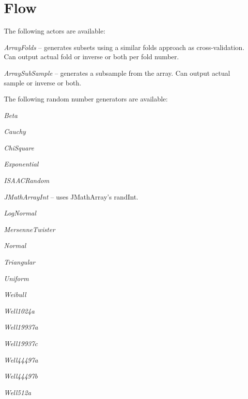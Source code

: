 \documentclass[a4paper]{book}
\begin{document}
\chapter{Flow}
The following actors are available:
\begin{tight_itemize}
	\item \textit{ArrayFolds} -- generates subsets using a similar folds 
	approach as cross-validation. Can output actual fold or inverse or both
	per fold number.
	\item \textit{ArraySubSample} -- generates a subsample from the array. 
	Can output actual sample or inverse or both.
\end{tight_itemize}
The following random number generators are available:
\begin{tight_itemize}
	\item \textit{Beta}
	\item \textit{Cauchy}
	\item \textit{ChiSquare}
	\item \textit{Exponential}
	\item \textit{ISAACRandom}
	\item \textit{JMathArrayInt} -- uses JMathArray's randInt.
	\item \textit{LogNormal}
	\item \textit{MersenneTwister}
	\item \textit{Normal}
	\item \textit{Triangular}
	\item \textit{Uniform}
	\item \textit{Weibull}
	\item \textit{Well1024a}
	\item \textit{Well19937a}
	\item \textit{Well19937c}
	\item \textit{Well44497a}
	\item \textit{Well44497b}
	\item \textit{Well512a}
\end{tight_itemize}


\end{document}
